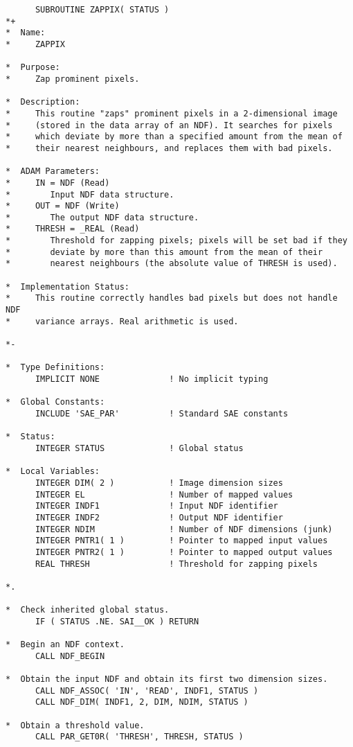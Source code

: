 \documentclass[twoside,11pt]{article}
\begin{document}
\small
\begin{verbatim}
      SUBROUTINE ZAPPIX( STATUS )
*+
*  Name:
*     ZAPPIX

*  Purpose:
*     Zap prominent pixels.

*  Description:
*     This routine "zaps" prominent pixels in a 2-dimensional image
*     (stored in the data array of an NDF). It searches for pixels
*     which deviate by more than a specified amount from the mean of
*     their nearest neighbours, and replaces them with bad pixels.

*  ADAM Parameters:
*     IN = NDF (Read)
*        Input NDF data structure.
*     OUT = NDF (Write)
*        The output NDF data structure.
*     THRESH = _REAL (Read)
*        Threshold for zapping pixels; pixels will be set bad if they
*        deviate by more than this amount from the mean of their
*        nearest neighbours (the absolute value of THRESH is used).

*  Implementation Status:
*     This routine correctly handles bad pixels but does not handle NDF
*     variance arrays. Real arithmetic is used.

*-
      
*  Type Definitions:
      IMPLICIT NONE              ! No implicit typing

*  Global Constants:
      INCLUDE 'SAE_PAR'          ! Standard SAE constants

*  Status:
      INTEGER STATUS             ! Global status

*  Local Variables:
      INTEGER DIM( 2 )           ! Image dimension sizes
      INTEGER EL                 ! Number of mapped values
      INTEGER INDF1              ! Input NDF identifier
      INTEGER INDF2              ! Output NDF identifier
      INTEGER NDIM               ! Number of NDF dimensions (junk)
      INTEGER PNTR1( 1 )         ! Pointer to mapped input values
      INTEGER PNTR2( 1 )         ! Pointer to mapped output values
      REAL THRESH                ! Threshold for zapping pixels

*.

*  Check inherited global status.
      IF ( STATUS .NE. SAI__OK ) RETURN

*  Begin an NDF context.
      CALL NDF_BEGIN

*  Obtain the input NDF and obtain its first two dimension sizes.
      CALL NDF_ASSOC( 'IN', 'READ', INDF1, STATUS )
      CALL NDF_DIM( INDF1, 2, DIM, NDIM, STATUS )

*  Obtain a threshold value.
      CALL PAR_GET0R( 'THRESH', THRESH, STATUS )


\end{verbatim}
\end{document}

